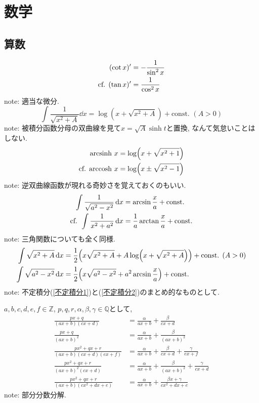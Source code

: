 \part{数学} %
\label{prt:数学}
\chapter*{算数} %
\label{cha:算数}
\begin{align}
    (\cot x)' &= -\frac{1}{\sin^2x} \\
    \text{cf. }(\tan x)' &= \frac{1}{\cos^2x}\notag
\end{align}
note: 適当な微分. 
\begin{equation}
\label{不定積分1}
    \int\frac{1}{\sqrt{x^2+A}}\dd{x} = \log(x+\sqrt{x^2+A})+\text{const. }(A>0)
\end{equation}
note: 被積分函数分母の双曲線を見て$x=\sqrt{A}\sinh t$と置換, なんて気怠いことはしない. 
\begin{align}
\label{逆双曲線関数}
    \mathrm{arcsinh}\ x &= \log(x+\sqrt{x^2+1}) \\
    \text{cf. }\mathrm{arccosh}\ x &= \log(x\pm\sqrt{x^2-1})\notag
\end{align}
note: 逆双曲線函数が現れる奇妙さを覚えておくのもいい. 
\begin{align}
\label{不定積分2}
    \int\frac{1}{\sqrt{a^2-x^2}}\dd{x} &= \arcsin\frac{x}{a}+\text{const.} \\
    \text{cf. }\int\frac{1}{x^2+a^2}\dd{x} &= \frac{1}{a}\arctan\frac{x}{a}+\text{const.}\notag
\end{align}
note: 三角関数についても全く同様. 
\begin{align}
    \int\sqrt{x^2+A}\dd{x} &= \frac{1}{2}\qty(x\sqrt{x^2+A}+A\log(x+\sqrt{x^2+A}))+\text{const. }(A>0) \\
    \int\sqrt{a^2-x^2}\dd{x} &= \frac{1}{2}\qty(x\sqrt{a^2-x^2}+a^2\arcsin\frac{x}{a})+\text{const.}
\end{align}
note: 不定積分(\ref{不定積分1})と(\ref{不定積分2})のまとめ的なものとして. 

$a,b,c,d,e,f\in\mathbb{Z}$, $p,q,r,\alpha,\beta,\gamma\in\mathbb{Q}$として, 
\begin{align}
    \frac{px+q}{(ax+b)(cx+d)} &= \frac{\alpha}{ax+b}+\frac{\beta}{cx+d} \\
    \frac{px+q}{(ax+b)^2} &= \frac{\alpha}{ax+b}+\frac{\beta}{(ax+b)^2} \\
    \frac{px^2+qx+r}{(ax+b)(cx+d)(ex+f)} &= \frac{\alpha}{ax+b}+\frac{\beta}{cx+d}+\frac{\gamma}{ex+f} \\
    \frac{px^2+qx+r}{(ax+b)^2(cx+d)} &= \frac{\alpha}{ax+b}+\frac{\beta}{(ax+b)^2}+\frac{\gamma}{cx+d} \\
    \frac{px^2+qx+r}{(ax+b)(cx^2+dx+e)} &= \frac{\alpha}{ax+b}+\frac{\beta x+\gamma}{cx^2+dx+e}
\end{align}
note: 部分分数分解. 

